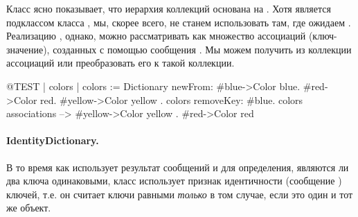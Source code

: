 \documentclass[a4paper,10pt,twoside]{book}
\begin{document}
Класс  ясно показывает, что иерархия коллекций основана на . Хотя  является подклассом класса , мы, скорее всего, не станем использовать  там, где ожидаем . Реализацию , однако, можно рассматривать как множество ассоциаций (ключ-значение), созданных с помощью сообщения . Мы можем получить  из коллекции ассоциаций или преобразовать его к такой коллекции.

\begin{code}{@TEST | colors |}
colors := Dictionary newFrom: { #blue->Color blue. #red->Color red. #yellow->Color yellow }.
colors removeKey: #blue.
colors associations --> {#yellow->Color yellow . #red->Color red}
\end{code}

\paragraph{IdentityDictionary.}
В то время как  использует результат сообщений \ct{=} и  для определения, являются ли два ключа одинаковыми, класс  использует признак идентичности (сообщение ) ключей, т.е. он считает ключи равными \emph{только} в том случае, если это один и тот же объект.
\end{document}
